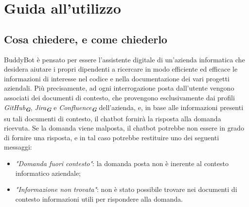 
\section{Guida all’utilizzo}
\label{sec:guida_utilizzo}


\subsection{Cosa chiedere, e come chiederlo}
\label{subsec:cosa_come_chiedere}

BuddyBot è pensato per essere l'assistente digitale di un'azienda informatica che desidera aiutare i propri dipendenti a ricercare in
modo efficiente ed efficace le informazioni di interesse nel codice e nella documentazione dei vari progetti aziendali. Più precisamente, ad
ogni interrogazione posta dall'utente vengono associati
dei documenti di contesto, che provengono esclusivamente dai profili \emph{GitHub}\textsubscript{\textbf{\textit{G}}},
\emph{Jira}\textsubscript{\textbf{\textit{G}}} e \emph{Confluence}\textsubscript{\textbf{\textit{G}}} dell'azienda, e, in base alle
informazioni presenti su tali documenti di contesto, il chatbot fornirà la risposta alla domanda ricevuta.
Se la domanda viene malposta, il chatbot potrebbe non essere in grado di fornire una risposta, e in tal caso potrebbe restituire
uno dei seguenti messaggi:
\begin{itemize}
    \item \emph{"Domanda fuori contesto"}: la domanda posta non è inerente al contesto informatico aziendale;
    \item \emph{"Informazione non trovata"}: non è stato possibile trovare nei documenti di contesto informazioni utili per rispondere
    alla domanda.
\end{itemize}

